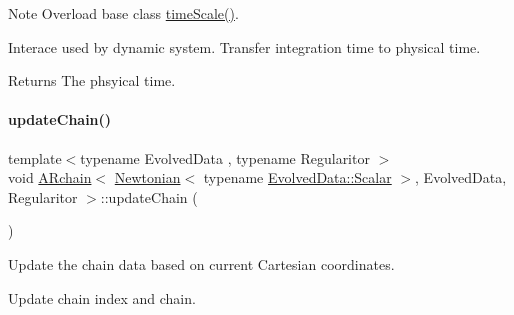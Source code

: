 \begin{DoxyNote}{Note}
Overload base class \mbox{\hyperlink{class_a_rchain_3_01_newtonian_3_01typename_01_evolved_data_1_1_scalar_01_4_00_01_evolved_data_00_01_regularitor_01_4_aa7aadb0b5ffcfebc759e4f091c4fc763}{time\+Scale()}}.
\end{DoxyNote}
Interace used by dynamic system. Transfer integration time to physical time. \begin{DoxyReturn}{Returns}
The phsyical time. 
\end{DoxyReturn}
\mbox{\label{class_a_rchain_3_01_newtonian_3_01typename_01_evolved_data_1_1_scalar_01_4_00_01_evolved_data_00_01_regularitor_01_4_acbe31e9aa918e4f80a2763e16f0bb7bc}} 
\paragraph{\texorpdfstring{update\+Chain()}{updateChain()}}
{\footnotesize\ttfamily template$<$typename Evolved\+Data , typename Regularitor $>$ \\
void \mbox{\hyperlink{class_a_rchain}{A\+Rchain}}$<$ \mbox{\hyperlink{class_newtonian}{Newtonian}}$<$ typename \mbox{\hyperlink{class_a_rchain_a707e42a79e4744424a34c9007e84ee07}{Evolved\+Data\+::\+Scalar}} $>$, Evolved\+Data, Regularitor $>$\+::update\+Chain (\begin{DoxyParamCaption}{ }\end{DoxyParamCaption})\hspace{0.3cm}{\ttfamily [private]}}



Update the chain data based on current Cartesian coordinates. 

Update chain index and chain.

